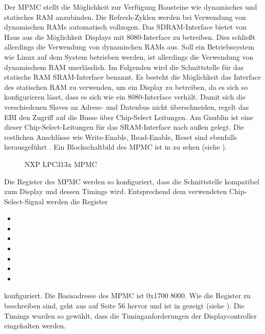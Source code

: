 Der MPMC stellt die Möglichkeit zur Verfügung Bausteine wie dynamisches und statisches RAM anzubinden. Die Refresh-Zyklen werden bei Verwendung von dynamischen RAMs automatisch vollzogen. Das SDRAM-Interface bietet von Haus aus die Möglichkeit Displays mit 8080-Interface zu betreiben. Dies schließt allerdings die Verwendung von dynamischen RAMs aus. Soll ein Betriebssystem wie Linux auf dem System betrieben werden, ist allerdings die Verwendung von dynamischem RAM unerlässlich. Im Folgenden wird die Schnittstelle für das statische RAM SRAM-Interface benannt. Es besteht die Möglichkeit das Interface des statischen RAM zu verwenden, um ein Display zu betreiben, da es sich so konfigurieren lässt, dass es sich wie ein 8080-Interface verhält. Damit sich die verschiedenen Slaves an Adress- und Datenbus nicht überschneiden, regelt das EBI den Zugriff auf die Busse über Chip-Select Leitungen. Am Gnublin ist eine dieser Chip-Select-Leitungen für das SRAM-Interface nach außen gelegt. Die restlichen Anschlüsse wie Write-Enable, Read-Enable, Reset sind ebenfalls herausgeführt \cite{NXP2010}. Ein Blockschaltbild des MPMC ist in  zu sehen (siehe \cite{NXP2010}).


\begin{figure}[tbph]
	\centering
{}
	\caption{NXP LPC313x MPMC}
	\label{fig:lpc_mpmc}
\end{figure}
\newpage
Die Register des MPMC werden so konfiguriert, dass die Schnittstelle kompatibel zum Display und dessen Timings wird. Entsprechend dem verwendeten Chip-Select-Signal werden die Register \begin{itemize}
\item {}
\item {}
\item  {}
\item  {}
\item  {}
\item  {}
\item {}
\end{itemize} konfiguriert. Die Basisadresse des MPMC ist 0x1700 8000. Wie die Register zu beschreiben sind, geht aus \cite{NXP2010} auf Seite 56 hervor und ist in  gezeigt (siehe \cite{NXP2010}). Die Timings wurden so gewählt, dass die Timinganforderungen der Displaycontroller eingehalten werden.

